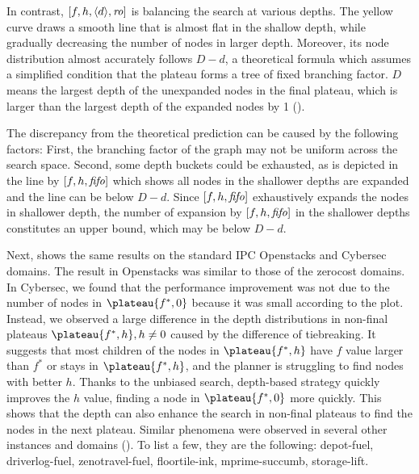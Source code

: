 In contrast, $[f,h,{\left<d\right>},{\text{\textit{ro}}}]$ is balancing the search at various depths.
The yellow curve draws a smooth line that is almost flat in the shallow depth, while gradually decreasing the number of nodes in larger depth.
Moreover, its node distribution almost accurately follows $D-d$, a theoretical formula which assumes a simplified
condition that the plateau forms a tree of fixed branching factor.
$D$ means the largest depth of the unexpanded nodes in the final plateau, which is
larger than the largest depth of the expanded nodes by 1
().

The discrepancy from the theoretical prediction can be caused by the 
following factors: First, the branching factor of the graph may not be
uniform across the search space. Second, some depth buckets could be
exhausted, as is depicted in the line by $[f,h,{\text{\textit{fifo}}}]$ which
shows all nodes in the shallower depths are expanded and the line can be below $D-d$.
Since $[f,h,{\text{\textit{fifo}}}]$ exhaustively expands the nodes in shallower depth,
the number of expansion by $[f,h,{\text{\textit{fifo}}}]$ in the shallower depths constitutes an upper bound, which may be below $D-d$.

Next,  shows the same results on the standard IPC
Openstacks and Cybersec domains.
The result in Openstacks was similar to those of the zerocost domains.
In Cybersec,
we found that the performance improvement was not due to the number of nodes in $\plateau{f^*,0}$ because it was small according to the plot.
Instead, we observed a large difference in the depth distributions in non-final plateaus $\plateau{f^*,h}, h\not=0$ caused by the difference of tiebreaking.
It suggests that most children of the nodes in $\plateau{f^*,h}$ have $f$ value larger than $f^*$ or stays in $\plateau{f^*,h}$, and the planner is struggling to find nodes with better $h$.
Thanks to the unbiased search, depth-based strategy quickly improves the $h$ value, finding a node in $\plateau{f^*,0}$ more quickly.
This shows that the depth can also enhance the search in non-final plateaus to find the nodes in the next plateau.
Similar phenomena were observed in several other instances and domains (). To list a few, they are the following: depot-fuel, driverlog-fuel, zenotravel-fuel, floortile-ink, mprime-succumb, storage-lift.

